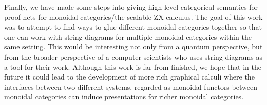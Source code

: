 Finally, we have made some steps into giving high-level categorical semantics for proof nets for monoidal categories/the scalable ZX-calculus.  The goal of this work was to attempt to find ways to glue different monoidal categories together so that one can work with string diagrams for multiple monoidal categories within the same setting.  This would be interesting not only from a quantum perspective, but from the broader perspective of a computer scientists who uses string diagrams as a tool for their work.  Although this work is far from finished, we hope that in the future it could lead to the development of more rich graphical calculi where the interfaces between two different systems, regarded as monoidal functors between monoidal categories can induce presentations for richer monoidal categories.






